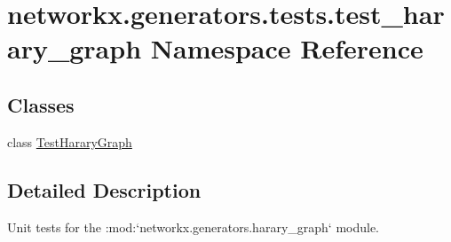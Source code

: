 \hypertarget{namespacenetworkx_1_1generators_1_1tests_1_1test__harary__graph}{}\section{networkx.\+generators.\+tests.\+test\+\_\+harary\+\_\+graph Namespace Reference}
\label{namespacenetworkx_1_1generators_1_1tests_1_1test__harary__graph}
\subsection*{Classes}
\begin{DoxyCompactItemize}
\item 
class \hyperlink{classnetworkx_1_1generators_1_1tests_1_1test__harary__graph_1_1TestHararyGraph}{Test\+Harary\+Graph}
\end{DoxyCompactItemize}


\subsection{Detailed Description}
\begin{DoxyVerb}Unit tests for the :mod:`networkx.generators.harary_graph` module.
\end{DoxyVerb}
 